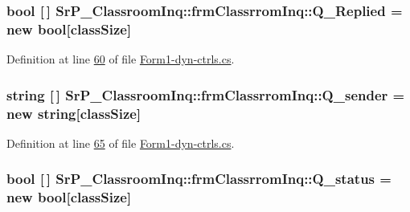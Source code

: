\hypertarget{class_sr_p___classroom_inq_1_1frm_classrrom_inq_af7c089d129d15a45c05bede3e9554f58}{
\subsubsection[{\-Q\-\_\-\-Replied}]{\setlength{\rightskip}{0pt plus 5cm}bool \mbox{[}$\,$\mbox{]} {\bf \-Sr\-P\-\_\-\-Classroom\-Inq\-::frm\-Classrrom\-Inq\-::\-Q\-\_\-\-Replied} = new bool\mbox{[}{\bf class\-Size}\mbox{]}}}
\label{class_sr_p___classroom_inq_1_1frm_classrrom_inq_af7c089d129d15a45c05bede3e9554f58}


\-Definition at line \hyperlink{_form1-dyn-ctrls_8cs_source_l00060}{60} of file \hyperlink{_form1-dyn-ctrls_8cs_source}{\-Form1-\/dyn-\/ctrls.\-cs}.

\hypertarget{class_sr_p___classroom_inq_1_1frm_classrrom_inq_afa4b6c4601d48db676d4013daef6624c}{
\subsubsection[{\-Q\-\_\-sender}]{\setlength{\rightskip}{0pt plus 5cm}string \mbox{[}$\,$\mbox{]} {\bf \-Sr\-P\-\_\-\-Classroom\-Inq\-::frm\-Classrrom\-Inq\-::\-Q\-\_\-sender} = new string\mbox{[}{\bf class\-Size}\mbox{]}}}
\label{class_sr_p___classroom_inq_1_1frm_classrrom_inq_afa4b6c4601d48db676d4013daef6624c}


\-Definition at line \hyperlink{_form1-dyn-ctrls_8cs_source_l00065}{65} of file \hyperlink{_form1-dyn-ctrls_8cs_source}{\-Form1-\/dyn-\/ctrls.\-cs}.

\hypertarget{class_sr_p___classroom_inq_1_1frm_classrrom_inq_ae02a7c8f440963717ee0cf2f74d4d56a}{
\subsubsection[{\-Q\-\_\-status}]{\setlength{\rightskip}{0pt plus 5cm}bool \mbox{[}$\,$\mbox{]} {\bf \-Sr\-P\-\_\-\-Classroom\-Inq\-::frm\-Classrrom\-Inq\-::\-Q\-\_\-status} = new bool\mbox{[}{\bf class\-Size}\mbox{]}}}
\label{class_sr_p___classroom_inq_1_1frm_classrrom_inq_ae02a7c8f440963717ee0cf2f74d4d56a}


